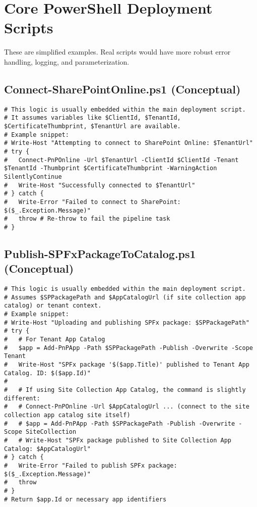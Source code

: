 

\chapter{Core PowerShell Deployment Scripts}
\label{appendix:PowerShellScripts}

These are simplified examples. Real scripts would have more robust error handling, logging, and parameterization.

\section{Connect-SharePointOnline.ps1 (Conceptual)}
\begin{verbatim}
# This logic is usually embedded within the main deployment script.
# It assumes variables like $ClientId, $TenantId, $CertificateThumbprint, $TenantUrl are available.
# Example snippet:
# Write-Host "Attempting to connect to SharePoint Online: $TenantUrl"
# try {
#   Connect-PnPOnline -Url $TenantUrl -ClientId $ClientId -Tenant $TenantId -Thumbprint $CertificateThumbprint -WarningAction SilentlyContinue
#   Write-Host "Successfully connected to $TenantUrl"
# } catch {
#   Write-Error "Failed to connect to SharePoint: $($_.Exception.Message)"
#   throw # Re-throw to fail the pipeline task
# }
\end{verbatim}

\section{Publish-SPFxPackageToCatalog.ps1 (Conceptual)}
\begin{verbatim}
# This logic is usually embedded within the main deployment script.
# Assumes $SPPackagePath and $AppCatalogUrl (if site collection app catalog) or tenant context.
# Example snippet:
# Write-Host "Uploading and publishing SPFx package: $SPPackagePath"
# try {
#   # For Tenant App Catalog
#   $app = Add-PnPApp -Path $SPPackagePath -Publish -Overwrite -Scope Tenant
#   Write-Host "SPFx package '$($app.Title)' published to Tenant App Catalog. ID: $($app.Id)"
#
#   # If using Site Collection App Catalog, the command is slightly different:
#   # Connect-PnPOnline -Url $AppCatalogUrl ... (connect to the site collection app catalog site itself)
#   # $app = Add-PnPApp -Path $SPPackagePath -Publish -Overwrite -Scope SiteCollection
#   # Write-Host "SPFx package published to Site Collection App Catalog: $AppCatalogUrl"
# } catch {
#   Write-Error "Failed to publish SPFx package: $($_.Exception.Message)"
#   throw
# }
# Return $app.Id or necessary app identifiers
\end{verbatim}


